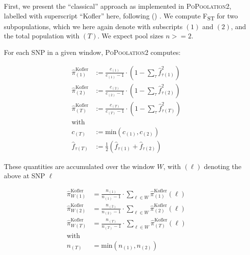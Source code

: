 \documentclass[letterpaper,fontsize=9pt,DIV=12]{scrartcl}
\newcounter{todo}
\newcommand\todo[1]{}
\newcommand\citeay[1]{\citeauthor{#1} (\citeyear{#1}) \cite{#1}}
\newcommand\toolname{\textsc}
\newcommand\secref[1]{Section~\ref{#1}}
\newcommand{\readdepth}{c}
\newcommand{\empfreq}{\widehat{f}}
\newcommand{\fst}{F\textsubscript{ST}}
\begin{document}

First, we present the ``classical'' approach as implemented in \toolname{PoPoolation2}, labelled with superscript ``Kofler'' here, following \citeay{Kofler2011b}.
We compute \fst{} for two subpopulations, which we here again denote with subscripts $(1)$ and $(2)$, and the total population with $(T)$. We expect pool sizes $n >= 2$.

For each SNP in a given window, \toolname{PoPoolation2} computes:

\begin{align}
    \label{eq:PoPoolation2FstPi:1}
    \widehat{\pi}_{(1)}^\text{Kofler}  &:= \frac{\readdepth_{(1)}}{\readdepth_{(1)}-1} \cdot  \left( 1 - \sum_\tau \empfreq_{\tau(1)}^2 \right) \\
    \label{eq:PoPoolation2FstPi:2}
    \widehat{\pi}_{(2)}^\text{Kofler}  &:= \frac{\readdepth_{(2)}}{\readdepth_{(2)}-1} \cdot  \left( 1 - \sum_\tau \empfreq_{\tau(2)}^2 \right) \\
    \label{eq:PoPoolation2FstPi:T}
    \widehat{\pi}_{(T)}^\text{Kofler}  &:= \frac{\readdepth_{(T)}}{\readdepth_{(T)}-1} \cdot  \left( 1 - \sum_\tau \empfreq_{\tau(T)}^2 \right) \\
    \nonumber
    \mbox{with} \\
    \nonumber
    \readdepth_{(T)} &:= \mbox{min} \left( \readdepth_{(1)}, \readdepth_{(2)} \right) \\
    \nonumber
    \empfreq_{\tau(T)} &:= \frac{1}{2} \left( \empfreq_{\tau(1)} + \empfreq_{\tau(2)} \right)
\end{align}

These quantities are accumulated over the window $W$, with $(\ell)$ denoting the above at SNP $\ell$

\begin{align}
    \label{eq:PoPoolation2FstWindow:1}
    \widehat{\pi}_{W(1)}^\text{Kofler} &= \frac{n_{(1)}}{n_{(1)}-1} \cdot \sum_{\ell\in W} \widehat{\pi}_{(1)}^\text{Kofler}(\ell)\\
    \label{eq:PoPoolation2FstWindow:2}
    \widehat{\pi}_{W(2)}^\text{Kofler} &= \frac{n_{(2)}}{n_{(2)}-1} \cdot \sum_{\ell\in W} \widehat{\pi}_{(2)}^\text{Kofler}(\ell)\\
    \label{eq:PoPoolation2FstWindow:T}
    \widehat{\pi}_{W(T)}^\text{Kofler} &= \frac{n_{(T)}}{n_{(T)}-1} \cdot \sum_{\ell\in W}  \widehat{\pi}_{(T)}^\text{Kofler}(\ell)\\
    \nonumber
    \mbox{with} \\
    \nonumber
    n_{(T)} &= \mbox{min} \left( n_{(1)}, n_{(2)} \right)
\end{align}
\end{document}
